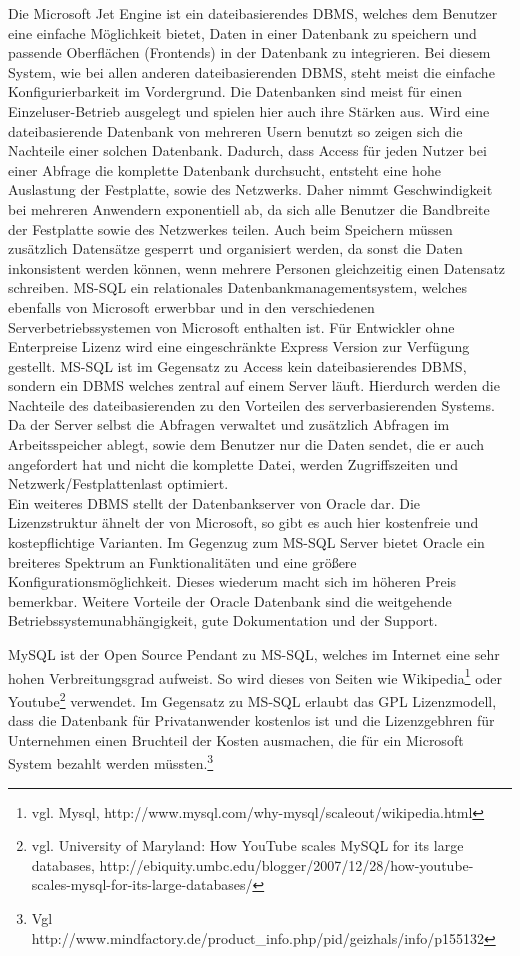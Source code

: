 Die Microsoft Jet Engine ist ein dateibasierendes DBMS, welches dem Benutzer eine einfache Möglichkeit bietet, Daten in einer Datenbank zu speichern und passende Oberflächen (Frontends) in der Datenbank zu integrieren.
Bei diesem System, wie bei allen anderen dateibasierenden DBMS, steht meist die einfache Konfigurierbarkeit im Vordergrund. Die Datenbanken sind meist für einen Einzeluser-Betrieb ausgelegt und spielen hier auch ihre Stärken aus.
Wird eine dateibasierende Datenbank von mehreren Usern benutzt so zeigen sich die Nachteile einer solchen Datenbank.
Dadurch, dass Access für jeden Nutzer bei einer Abfrage die komplette Datenbank durchsucht, entsteht eine hohe Auslastung der Festplatte, sowie des Netzwerks. Daher nimmt Geschwindigkeit bei mehreren Anwendern exponentiell ab, da sich alle Benutzer die Bandbreite der Festplatte sowie des Netzwerkes teilen.
Auch beim Speichern müssen zusätzlich Datensätze gesperrt und organisiert werden, da sonst die Daten inkonsistent werden können, wenn mehrere Personen gleichzeitig einen Datensatz schreiben.
MS-SQL ein relationales Datenbankmanagementsystem, welches ebenfalls von Microsoft erwerbbar
und in den verschiedenen Serverbetriebssystemen von Microsoft enthalten ist. Für Entwickler
ohne Enterpreise Lizenz wird eine eingeschränkte Express Version zur Verfügung gestellt. MS-SQL ist im Gegensatz zu Access kein dateibasierendes DBMS, sondern ein DBMS welches
zentral auf einem Server läuft. Hierdurch werden die Nachteile des dateibasierenden zu
den Vorteilen des serverbasierenden Systems. Da der Server selbst die Abfragen verwaltet
und zusätzlich Abfragen im Arbeitsspeicher ablegt, sowie dem Benutzer nur die Daten
sendet, die er auch angefordert hat und nicht die komplette Datei, werden Zugriffszeiten
und Netzwerk/Festplattenlast optimiert.\\
Ein weiteres DBMS stellt der Datenbankserver von Oracle dar. Die Lizenzstruktur ähnelt der von Microsoft, so gibt es auch hier kostenfreie und kostepflichtige Varianten. Im Gegenzug zum MS-SQL Server bietet Oracle ein breiteres Spektrum an Funktionalitäten und eine größere Konfigurationsmöglichkeit. Dieses wiederum macht sich im höheren Preis bemerkbar. Weitere Vorteile der Oracle Datenbank sind die weitgehende Betriebssystemunabhängigkeit, gute Dokumentation und der Support.

MySQL ist der Open Source Pendant zu MS-SQL, welches im Internet eine sehr hohen Verbreitungsgrad aufweist.
So wird dieses von Seiten wie Wikipedia\footnote{vgl. Mysql, http://www.mysql.com/why-mysql/scaleout/wikipedia.html} oder
Youtube\footnote{vgl. University of Maryland: How YouTube scales MySQL for its large databases, http://ebiquity.umbc.edu/blogger/2007/12/28/how-youtube-scales-mysql-for-its-large-databases/} verwendet.
Im Gegensatz zu MS-SQL erlaubt das GPL Lizenzmodell, dass die Datenbank für Privatanwender kostenlos ist und die Lizenzgebhren für Unternehmen einen Bruchteil der Kosten ausmachen, die für ein Microsoft System bezahlt werden müssten.\footnote{Vgl http://www.mindfactory.de/product\_info.php/pid/geizhals/info/p155132}


